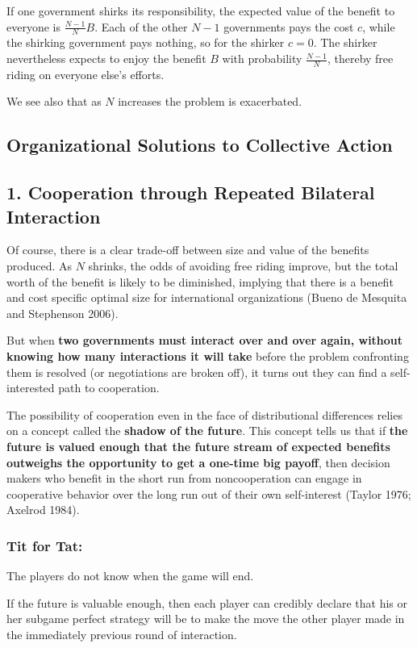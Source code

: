If one government shirks its responsibility, the expected value of the benefit to everyone is $\frac{N-1}{N}B$. Each of the other $N-1$ governments pays the cost $c$, while the shirking government pays nothing, so for the shirker $c=0$. The shirker nevertheless expects to enjoy the benefit $B$ with probability $\frac{N-1}{N}$, thereby free riding on everyone else's efforts.

We see also that as $N$ increases the problem is exacerbated.

\subsection{Organizational Solutions to Collective Action}
\subsection{1. Cooperation through Repeated Bilateral Interaction}

Of course, there is a clear trade-off between size and value of the benefits produced. As $N$ shrinks, the odds of avoiding free riding improve, but the total worth of the benefit is likely to be diminished, implying that there is a benefit and cost specific optimal size for international organizations (Bueno de Mesquita and Stephenson 2006).

But when \textbf{two governments must interact over and over again, without knowing how many interactions it will take} before the problem confronting them is resolved (or negotiations are broken off), it turns out they can find a self-interested path to cooperation.

The possibility of cooperation even in the face of distributional differences relies on a concept called the \textbf{shadow of the future}. This concept tells us that if \textbf{the future is valued enough that the future stream of expected benefits outweighs the opportunity to get a one-time big payoff}, then decision makers who benefit in the short run from noncooperation can engage in cooperative behavior over the long run out of their own self-interest (Taylor 1976; Axelrod 1984).

\subsubsection{Tit for Tat:} The players do not know when the game will end. 

If the future is valuable enough, then each player can credibly declare that his or her subgame perfect strategy will be to make the move the other player made in the immediately previous round of interaction.

